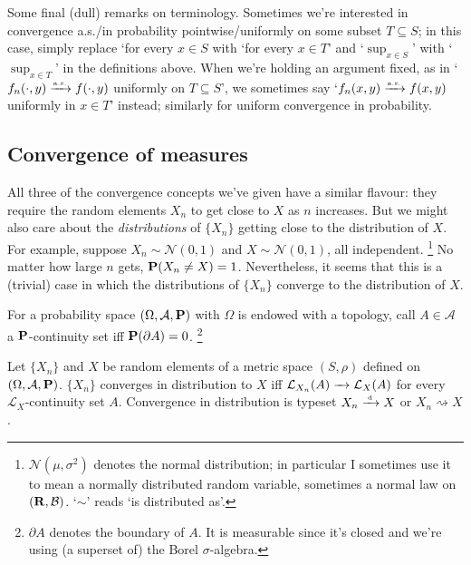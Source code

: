 \documentclass[11pt,letterpaper,reqno,oneside]{article}
\begin{document}
Some final (dull) remarks on terminology. Sometimes we're interested in convergence a.s./in probability pointwise/\allowbreak uniformly on some subset $T \subseteq S$; in this case, simply replace `for every $x \in S$ with `for every $x \in T$' and `$\sup_{x \in S}$' with `$\sup_{x \in T}$' in the definitions above. When we're holding an argument fixed, as in `$f_n(\cdot,y) \xrightarrow{{\scriptscriptstyle \mathrm{a.s.}}} f(\cdot,y)$ uniformly on $T \subseteq S$', we sometimes say `$f_n(x,y) \xrightarrow{{\scriptscriptstyle \mathrm{a.s.}}} f(x,y)$ uniformly in $x \in T$' instead; similarly for uniform convergence in probability.



\subsection{Convergence of measures}
\label{sec:modes_of_convergence:convergence_measures}

All three of the convergence concepts we've given have a similar flavour: they require the random elements $X_n$ to get close to $X$ as $n$ increases. But we might also care about the \emph{distributions} of $\{ X_n \}$ getting close to the distribution of $X$. For example, suppose $X_n \sim \mathcal{N}(0,1)$ and $X \sim \mathcal{N}(0,1)$, all independent.%
	\footnote{$\mathcal{N}\left(\mu,\sigma^2\right)$ denotes the normal distribution; in particular I sometimes use it to mean a normally distributed random variable, sometimes a normal law on $(\mathbf{R},\mathcal{B})$. `$\sim$' reads `is distributed as'.}
No matter how large $n$ gets, $\mathbf{P}( X_n \neq X )=1$. Nevertheless, it seems that this is a (trivial) case in which the distributions of $\{ X_n \}$ converge to the distribution of $X$.


For a probability space $(\Omega,\mathcal{A},\mathbf{P})$ with $\Omega$ is endowed with a topology, call $A \in \mathcal{A}$ a $\mathbf{P}$-continuity set iff $\mathbf{P}( \partial A) = 0$.%
	\footnote{$\partial A$ denotes the boundary of $A$. It is measurable since it's closed and we're using (a superset of) the Borel $\sigma$-algebra.}
%
\begin{definition}
	Let $\{ X_n \}$ and $X$ be random elements of a metric space $(S,\rho)$ defined on $(\Omega,\mathcal{A},\mathbf{P})$. $\{ X_n \}$ converges in distribution to $X$ iff $\mathcal{L}_{X_n}(A) \xrightarrow{\;\;\;} \mathcal{L}_X(A)$ for every $\mathcal{L}_X$-continuity set $A$. Convergence in distribution is typeset $X_n \xrightarrow{{\scriptscriptstyle \mathrm{\;d\;}}} X$ or $X_n \rightsquigarrow X$.
\end{definition}
\end{document}
